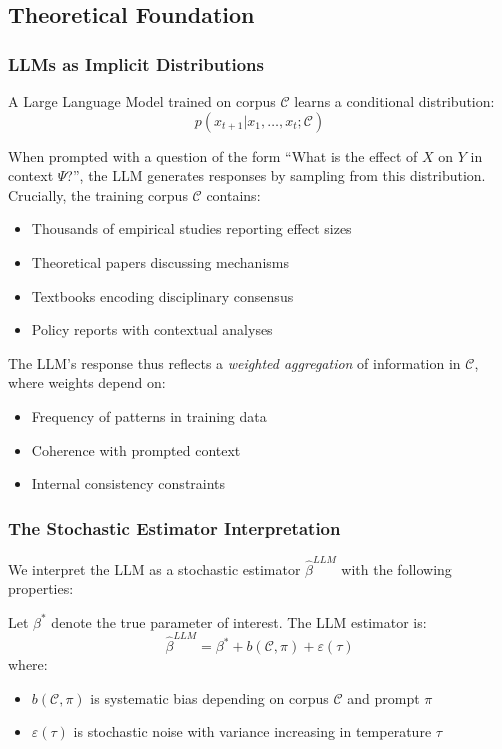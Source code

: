 \subsection{Theoretical Foundation}

\subsubsection{LLMs as Implicit Distributions}

A Large Language Model trained on corpus $\mathcal{C}$ learns a conditional distribution:
\begin{equation}
p(x_{t+1} | x_1, \ldots, x_t; \mathcal{C})
\end{equation}

When prompted with a question of the form ``What is the effect of $X$ on $Y$ in context $\Psi$?'', the LLM generates responses by sampling from this distribution. Crucially, the training corpus $\mathcal{C}$ contains:
\begin{itemize}
    \item Thousands of empirical studies reporting effect sizes
    \item Theoretical papers discussing mechanisms
    \item Textbooks encoding disciplinary consensus
    \item Policy reports with contextual analyses
\end{itemize}

The LLM's response thus reflects a \textit{weighted aggregation} of information in $\mathcal{C}$, where weights depend on:
\begin{itemize}
    \item Frequency of patterns in training data
    \item Coherence with prompted context
    \item Internal consistency constraints
\end{itemize}

\subsubsection{The Stochastic Estimator Interpretation}

We interpret the LLM as a stochastic estimator $\hat{\beta}^{LLM}$ with the following properties:

\begin{definition}
Let $\beta^*$ denote the true parameter of interest. The LLM estimator is:
\begin{equation}
\hat{\beta}^{LLM} = \beta^* + b(\mathcal{C}, \pi) + \varepsilon(\tau)
\end{equation}
where:
\begin{itemize}
    \item $b(\mathcal{C}, \pi)$ is systematic bias depending on corpus $\mathcal{C}$ and prompt $\pi$
    \item $\varepsilon(\tau)$ is stochastic noise with variance increasing in temperature $\tau$
\end{itemize}
\end{definition}

